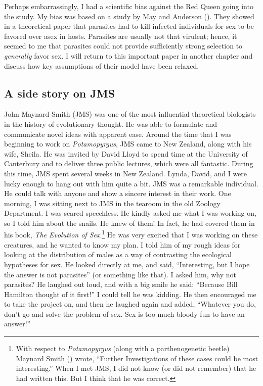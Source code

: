 \documentclass[
  american,
  letterpaper,
]{book}
\begin{document}
Perhaps embarrassingly, I had a scientific bias against the Red Queen
going into the study. My bias was based on a study by May and Anderson
(). They showed in a theoretical paper that
parasites had to kill infected individuals for sex to be favored over
asex in hosts. Parasites are usually not that virulent; hence, it seemed
to me that parasites could not provide sufficiently strong selection to
\emph{generally} favor sex. I will return to this important paper in
another chapter and discuss how key assumptions of their model have been
relaxed.

\subsection{A side story on JMS}\label{a-side-story-on-jms}

John Maynard Smith (JMS) was one of the most influential theoretical
biologists in the history of evolutionary thought. He was able to
formulate and communicate novel ideas with apparent ease. Around the
time that I was beginning to work on \emph{Potamopyrgus}, JMS came to
New Zealand, along with his wife, Sheila. He was invited by David Lloyd
to spend time at the University of Canterbury and to deliver three
public lectures, which were all fantastic. During this time, JMS spent
several weeks in New Zealand. Lynda, David, and I were lucky enough to
hang out with him quite a bit. JMS was a remarkable individual. He could
talk with anyone and show a sincere interest in their work. One morning,
I was sitting next to JMS in the tearoom in the old Zoology Department.
I was scared speechless. He kindly asked me what I was working on, so I
told him about the snails. He knew of them! In fact, he had covered them
in his book, \emph{The Evolution of Sex}.\footnote{With respect to
  \emph{Potamopyrgus} (along with a parthenogenetic beetle) Maynard
  Smith () wrote, ``Further
  Investigations of these cases could be most interesting.'' When I met
  JMS, I did not know (or did not remember) that he had written this.
  But I think that he was correct.} He was very excited that I was
working on these creatures, and he wanted to know my plan. I told him of
my rough ideas for looking at the distribution of males as a way of
contrasting the ecological hypotheses for sex. He looked directly at me,
and said, ``Interesting, but I hope the answer is not parasites'' (or
something like that). I asked him, why not parasites? He laughed out
loud, and with a big smile he said: ``Because Bill Hamilton thought of
it first!'' I could tell he was kidding. He then encouraged me to take
the project on, and then he laughed again and added, ``Whatever you do,
don't go and solve the problem of sex. Sex is too much bloody fun to
have an answer!''
\end{document}

